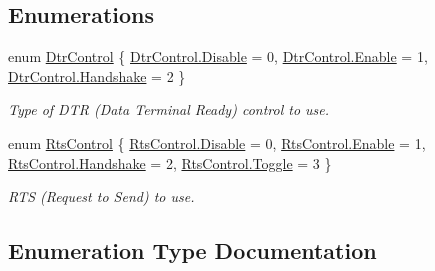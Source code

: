 \subsection*{Enumerations}
\begin{DoxyCompactItemize}
\item 
enum \mbox{\hyperlink{namespace_r_j_c_p_1_1_i_o_1_1_ports_1_1_native_1_1_windows_a4614d831b6a31af0b55d3a9ad2b55d49}{Dtr\+Control}} \{ \mbox{\hyperlink{namespace_r_j_c_p_1_1_i_o_1_1_ports_1_1_native_1_1_windows_a4614d831b6a31af0b55d3a9ad2b55d49abcfaccebf745acfd5e75351095a5394a}{Dtr\+Control.\+Disable}} = 0, 
\mbox{\hyperlink{namespace_r_j_c_p_1_1_i_o_1_1_ports_1_1_native_1_1_windows_a4614d831b6a31af0b55d3a9ad2b55d49a2faec1f9f8cc7f8f40d521c4dd574f49}{Dtr\+Control.\+Enable}} = 1, 
\mbox{\hyperlink{namespace_r_j_c_p_1_1_i_o_1_1_ports_1_1_native_1_1_windows_a4614d831b6a31af0b55d3a9ad2b55d49a7559811a22a9c4b79332bd85a197e4c5}{Dtr\+Control.\+Handshake}} = 2
 \}
\begin{DoxyCompactList}\small\item\em Type of D\+TR (Data Terminal Ready) control to use. \end{DoxyCompactList}\item 
enum \mbox{\hyperlink{namespace_r_j_c_p_1_1_i_o_1_1_ports_1_1_native_1_1_windows_af1fd3db760164d1cff4fb8e7a50ead2f}{Rts\+Control}} \{ \mbox{\hyperlink{namespace_r_j_c_p_1_1_i_o_1_1_ports_1_1_native_1_1_windows_af1fd3db760164d1cff4fb8e7a50ead2fabcfaccebf745acfd5e75351095a5394a}{Rts\+Control.\+Disable}} = 0, 
\mbox{\hyperlink{namespace_r_j_c_p_1_1_i_o_1_1_ports_1_1_native_1_1_windows_af1fd3db760164d1cff4fb8e7a50ead2fa2faec1f9f8cc7f8f40d521c4dd574f49}{Rts\+Control.\+Enable}} = 1, 
\mbox{\hyperlink{namespace_r_j_c_p_1_1_i_o_1_1_ports_1_1_native_1_1_windows_af1fd3db760164d1cff4fb8e7a50ead2fa7559811a22a9c4b79332bd85a197e4c5}{Rts\+Control.\+Handshake}} = 2, 
\mbox{\hyperlink{namespace_r_j_c_p_1_1_i_o_1_1_ports_1_1_native_1_1_windows_af1fd3db760164d1cff4fb8e7a50ead2faa8875bbe4272c0bdd786cfaaedf77921}{Rts\+Control.\+Toggle}} = 3
 \}
\begin{DoxyCompactList}\small\item\em R\+TS (Request to Send) to use. \end{DoxyCompactList}\end{DoxyCompactItemize}


\subsection{Enumeration Type Documentation}
\mbox{\label{namespace_r_j_c_p_1_1_i_o_1_1_ports_1_1_native_1_1_windows_a4614d831b6a31af0b55d3a9ad2b55d49}} 

